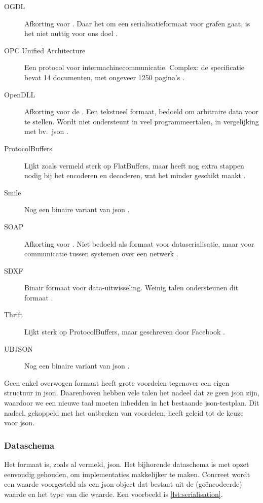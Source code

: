 \begin{description}
    \item[OGDL] Afkorting voor .
    Daar het om een serialisatieformaat voor grafen gaat, is het niet nuttig voor ons doel \autocite{ogdl}.
    \item[OPC Unified Architecture] Een protocol voor intermachinecommunicatie.
    Complex: de specificatie bevat 14 documenten, met ongeveer 1250 pagina's \autocite{tr62541}.
    \item[OpenDLL] Afkorting voor de .
    Een tekstueel formaat, bedoeld om arbitraire data voor te stellen.
    Wordt niet ondersteunt in veel programmeertalen, in vergelijking met bv.\ json \autocite{openddl}.
    \item[ProtocolBuffers] Lijkt zoals vermeld sterk op FlatBuffers, maar heeft nog extra stappen nodig bij het encoderen en decoderen, wat het minder geschikt maakt \autocite{protobuf}.
    \item[Smile] Nog een binaire variant van json \autocite{smile}.
    \item[SOAP] Afkorting voor .
    Niet bedoeld als formaat voor dataserialisatie, maar voor communicatie tussen systemen over een netwerk \autocite{soap}.
    \item[SDXF] Binair formaat voor data-uitwisseling.
    Weinig talen ondersteunen dit formaat \autocite{rfc3072}.
    \item[Thrift] Lijkt sterk op ProtocolBuffers, maar geschreven door Facebook \autocite{slee2007}.
    \item[UBJSON] Nog een binaire variant van json \autocite{ubjson}.

\end{description}

Geen enkel overwogen formaat heeft grote voordelen tegenover een eigen structuur in json.
Daarenboven hebben vele talen het nadeel dat ze geen json zijn, waardoor we een nieuwe taal moeten inbedden in het bestaande json-testplan.
Dit nadeel, gekoppeld met het ontbreken van voordelen, heeft geleid tot de keuze voor json.

\subsubsection{Dataschema}

Het formaat is, zoals al vermeld, json.
Het bijhorende dataschema is met opzet eenvoudig gehouden, om implementaties makkelijker te maken.
Concreet wordt een waarde voorgesteld als een json-object dat bestaat uit de (geëncodeerde) waarde en het type van die waarde.
Een voorbeeld is \cref{lst:serialisation}.

